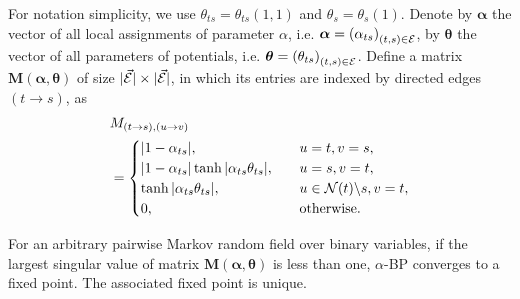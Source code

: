 For notation simplicity, we use $\theta_{ts}=\theta_{ts}(1, 1)$ and $\theta_s = \theta_s(1)$. Denote by $\bm{\alpha}$ the vector of all local assignments of parameter $\alpha$, i.e. $\bm{\alpha} = \left(  \alpha_{ts} \right)_{(t ,s) \in \mathcal{E} }$, by $\bm{\theta}$ the vector of all parameters of potentials, i.e. $\bm{\theta} = \left(  \theta_{ts} \right)_{(t ,s) \in \mathcal{E} }$.  Define a matrix $\bm{M}(\bm{\alpha}, \bm{\theta})$ of size $| \vec{\mathcal{E}} | \times | \vec{\mathcal{E}} |$, in which its entries are indexed by directed edges $(t\rightarrow s)$, as
\begin{align}\label{eq:matrix_m}
  &M_{(t\rightarrow s), (u \rightarrow v)} \nonumber \\
  &=
    \begin{cases}
      |  1 - \alpha_{ts} |, &\quad u=t, v=s, \\
      |  1 - \alpha_{ts} | \tanh | \alpha_{ts} \theta_{ts} |, & \quad u = s, v =t, \\
      \tanh| \alpha_{ts} \theta_{ts} |, & \quad u \in \mathcal{N}(t)\backslash s, v = t, \\
      0, & \quad \mathrm{otherwise}.
    \end{cases}
\end{align}
\begin{theorem}\label{thm:normd}
  For an arbitrary pairwise Markov random field over binary variables,
  if the largest singular value of matrix $\bm{M}(\bm{\alpha}, \bm{\theta})$ is less than one,
  $\alpha$-BP converges to a fixed point. The associated fixed point is unique.
\end{theorem}

